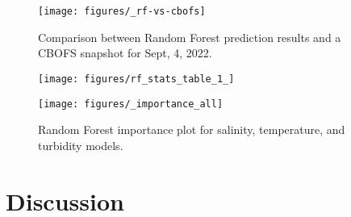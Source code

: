 \documentclass{article}
\begin{document}
\begin{figure}[ht!]
    \begin{center}
          \texttt{[image: figures/\_rf-vs-cbofs]}
          \caption{Comparison between Random Forest prediction results and a CBOFS snapshot for Sept, 4, 2022.}
    \end{center}    
\end{figure}

\begin{figure}[ht!]
    \begin{center}
          \texttt{[image: figures/rf\_stats\_table\_1\_]}          
    \end{center}    
\end{figure}

\begin{figure}[ht!]
    \begin{center}
          \texttt{[image: figures/\_importance\_all]}
          \caption{Random Forest importance plot for salinity, temperature, and turbidity models.}
    \end{center}    
\end{figure}

\section{Discussion}

\FloatBarrier


\end{document}

